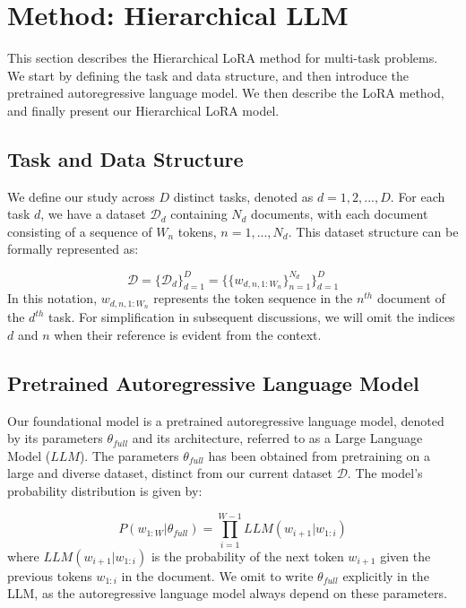 \documentclass{article}
\begin{document}
\section{Method: Hierarchical LLM} \label{sec:method}
This section describes the Hierarchical LoRA method for multi-task problems. We start by defining the task and data structure, and then introduce the pretrained autoregressive language model. We then describe the LoRA method, and finally present our Hierarchical LoRA model.

\subsection{Task and Data Structure}
We define our study across $D$ distinct tasks, denoted as $d=1,2,...,D$. For each task $d$, we have a dataset $\mathcal{D}_d$ containing $N_d$ documents, with each document consisting of a sequence of $W_n$ tokens, $n=1,..., N_d$. This dataset structure can be formally represented as:

\begin{equation} \label{eq:data}
\mathcal{D} = \{ \mathcal{D}_d \}_{d=1}^D  =  \{ \{ w_{d,n,1:W_n} \}_{n=1}^{N_d} \}_{d=1}^D
\end{equation}
%
In this notation, $w_{d,n,1:W_n}$ represents the token sequence in the $n^{th}$ document of the $d^{th}$ task. For simplification in subsequent discussions, we will omit the indices $d$ and $n$ when their reference is evident from the context.

\subsection{Pretrained Autoregressive Language Model}
Our foundational model is a pretrained autoregressive language model, denoted by its parameters $\theta_{full}$ and its architecture, referred to as a Large Language Model ($LLM$). The parameters $\theta_{full}$ has been obtained from pretraining on a large and diverse dataset, distinct from our current dataset $\mathcal{D}$. 
The model's probability distribution is given by:

\begin{equation} \label{eq:LLMprob}
P(w_{1:W} | \theta_{full}) = \prod_{i=1}^{W-1} LLM(w_{i+1} | w_{1:i})
\end{equation}
%
where $LLM(w_{i+1} | w_{1:i})$ is the probability of the next token $w_{i+1}$ given the previous tokens $w_{1:i}$ in the document.
We omit to write $\theta_{full}$ explicitly in the LLM, as the autoregressive language model always depend on these parameters.
\end{document}
